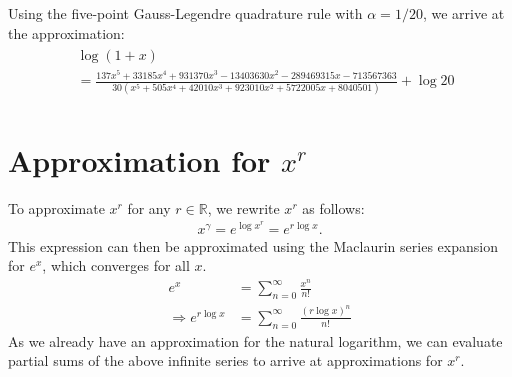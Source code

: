 Using the five-point Gauss-Legendre quadrature rule with $\alpha = 1/20$, we arrive at the approximation:
\begin{align}\label{eq:scaledquadrature}
  \begin{split}
    &\log(1+x) \\
    &=\frac{137x^5 + 33185x^4 + 931370x^3 - 13403630x^2 - 289469315x - 713567363}
    {30(x^5 + 505x^4 + 42010x^3 + 923010x^2 + 5722005x + 8040501)} + \log{20}
  \end{split}
\end{align}
\section{Approximation for $x^r$}
To approximate $x^r$ for any $r \in \mathbb{R}$, we rewrite $x^r$ as follows:
\begin{align*}
  x^\gamma = e^{\log{x^r}} = e^{r\log{x}}.
\end{align*}
This expression can then be approximated using the Maclaurin series expansion for $e^x$, which converges for all $x$.
\begin{align*}
  e^x &= \sum_{n=0}^{\infty}{\frac{x^n}{n!}}\\
  \Rightarrow e^{r\log{x}} &= \sum_{n=0}^{\infty}{\frac{(r\log{x})^n}{n!}}
\end{align*}
As we already have an approximation for the natural logarithm, we can evaluate partial sums of the above infinite series to arrive at approximations for $x^r$.
